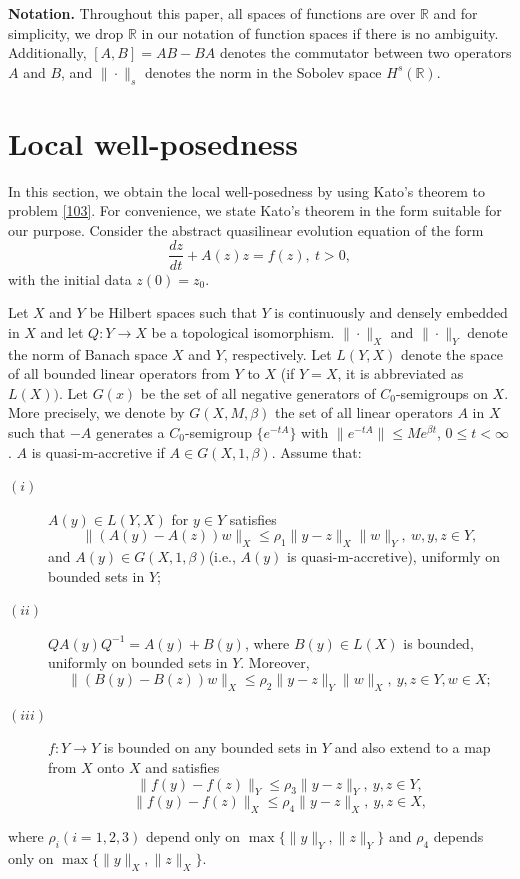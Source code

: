 \documentclass[preprint,12pt]{elsarticle}
\numberwithin{equation}{section}
\begin{document}
\textbf{Notation.} Throughout this paper, all spaces of functions are over $\mathbb{R}$ and for simplicity, we drop $\mathbb{R}$ in our notation of function spaces if there is no ambiguity. Additionally, $[A,B]=AB-BA$ denotes the commutator between two operators $A$ and $B$, and $\|\cdot\|_{s}$ denotes the norm in the Sobolev space $H^{s}(\mathbb{R})$.



\section{Local well-posedness}

\setcounter{equation}{0}

\label{sec:2}

In this section, we obtain the local well-posedness by using Kato's theorem to problem \eqref{103}.
For convenience, we state Kato's theorem in the form suitable for our purpose.
Consider the abstract quasilinear evolution equation of the form
\begin{equation}
\frac{dz}{dt}+A(z)z=f(z),\ t>0,
\label{201}
\end{equation}
with the initial data $ z(0)=z_{0}.$

Let $X$ and $Y$ be Hilbert spaces such that $Y$ is continuously and densely embedded in $X$ and let $Q:Y\rightarrow X$ be a topological isomorphism. $\|\cdot\|_{X}$ and $\|\cdot\|_{Y}$ denote the norm of Banach space $X$ and $Y$, respectively. Let $L(Y, X)$ denote the space of all bounded linear operators from $Y$ to $X$ (if $Y=X$, it is abbreviated as $L(X))$.
Let $G(x)$ be the set of all negative generators of $C_0$-semigroups on $X$. More precisely, we denote by $G(X,M,\beta)$ the set of all linear operators $A$ in $X$ such that $-A$ generates a $C_0$-semigroup $\{e^{-tA}\}$ with $\|e^{-tA}\|\leq Me^{\beta t}$, $0\leq t<\infty$. $A$ is quasi-m-accretive if $A\in G(X,1,\beta)$.
Assume that:
\begin{description}
\item[$(i)$] $A(y)\in L(Y, X)$ for $y\in Y$ satisfies
$$\|(A(y)-A(z))w\|_{X}\leq \rho_{1}\|y-z\|_{X}\|w\|_{Y},\ w,y,z\in Y,$$
and $A(y)\in G(X,1,\beta)$(i.e., $A(y)$ is quasi-m-accretive), uniformly on bounded sets in $Y$;
\item[$(ii)$] $QA(y)Q^{-1}=A(y)+B(y)$, where $B(y)\in L(X)$ is bounded, uniformly on bounded sets in $Y$. Moreover,
$$\|(B(y)-B(z))w\|_{X}\leq \rho_{2}\|y-z\|_{Y}\|w\|_{X},\ y,z\in Y, w\in X;$$
\item[$(iii)$] $f:Y\rightarrow Y$ is bounded on any bounded sets in $Y$ and also extend to a map from $X$ onto $X$ and satisfies
$$\|f(y)-f(z)\|_{Y}\leq \rho_{3}\|y-z\|_{Y},\ y,z\in Y,$$
$$\|f(y)-f(z)\|_{X}\leq \rho_{4}\|y-z\|_{X},\ y,z\in X,$$
\end{description}
where $\rho_{i}(i=1,2,3)$ depend only on $\max\{\|y\|_{Y},\|z\|_{Y}\}$ and $\rho_{4}$ depends only on $\max\{\|y\|_{X},\|z\|_{X}\}.$
\end{document}
